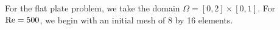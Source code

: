 \documentclass{article}
\newcommand{\Reyn}{\rm Re}
\begin{document}
For the flat plate problem, we take the domain $\Omega = [0,2]\times[0,1]$. For $\Reyn = 500$, we begin with an initial mesh of 8 by 16 elements. 
\begin{figure}[!h]
\centering
{}

\end{figure}
\end{document}
